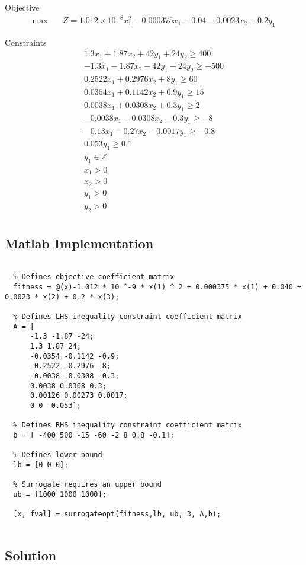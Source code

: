 \documentclass[
]{article}
\begin{document}
Objective
\begin{align}
	\max \quad
	  & Z = 1.012 \times 10^{-8} x_1^2 - 0.000375x_1 - 0.04 - 0.0023x_2 - 0.2y_1 
\end{align}

Constraints
\begin{align}
	1.3x_1 + 1.87x_2 + 42y_1 + 24y_2 \ge 400 \\
	-1.3x_1 - 1.87x_2 - 42y_1 - 24y_2 \ge -500 \\
	0.2522x_1 + 0.2976x_2 + 8y_1 \ge 60      \\
	0.0354x_1 + 0.1142x_2 + 0.9y_1 \ge 15    \\
	0.0038x_1 + 0.0308x_2 + 0.3y_1  \ge 2    \\
	-0.0038x_1 - 0.0308x_2 - 0.3y_1 \ge -8     \\
	-0.13x_1 - 0.27x_2 - 0.0017y_1 \ge -0.8    \\
	0.053y_1 \ge 0.1                         \\
  y_1 \in \mathbb{Z}                       \\
	x_1 > 0                                  \\
	x_2 > 0                                  \\
	y_1 > 0                                  \\
	y_2 > 0                                  \\
\end{align}

\newpage

\hypertarget{matlab-implementation-2}{%
	\subsection{Matlab Implementation}\label{matlab-implementation-2}}

\begin{lstlisting}[numbers=none]

  % Defines objective coefficient matrix
  fitness = @(x)-1.012 * 10 ^-9 * x(1) ^ 2 + 0.000375 * x(1) + 0.040 + 0.0023 * x(2) + 0.2 * x(3);
  
  % Defines LHS inequality constraint coefficient matrix
  A = [
      -1.3 -1.87 -24;
      1.3 1.87 24;
      -0.0354 -0.1142 -0.9;
      -0.2522 -0.2976 -8;
      -0.0038 -0.0308 -0.3;
      0.0038 0.0308 0.3;
      0.00126 0.00273 0.0017;
      0 0 -0.053];
  
  % Defines RHS inequality constraint coefficient matrix
  b = [ -400 500 -15 -60 -2 8 0.8 -0.1];
  
  % Defines lower bound
  lb = [0 0 0];
  
  % Surrogate requires an upper bound
  ub = [1000 1000 1000];
  
  [x, fval] = surrogateopt(fitness,lb, ub, 3, A,b);
  
\end{lstlisting}
\hypertarget{solution-2}{%
	\subsection{Solution}\label{solution-2}}
\end{document}
